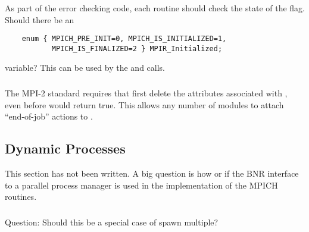 \documentclass{article}
\begin{document}
\subsubsection{}
As part of the error checking code, each routine should check the
state of the  flag.  Should there be an 
\begin{verbatim}
    enum { MPICH_PRE_INIT=0, MPICH_IS_INITIALIZED=1,
           MPICH_IS_FINALIZED=2 } MPIR_Initialized;
\end{verbatim}
variable?  This can be used by the  and
 calls.

\subsubsection{}
The MPI-2 standard requires that  first delete the
attributes associated with , even before
 would return true.  This allows any number of
modules to attach ``end-of-job'' actions to .


\subsection{Dynamic Processes}

This section has not been written.  A big question is how or if the BNR
interface to a parallel process manager is used in the implementation
of the MPICH routines.  

\subsubsection{}
\subsubsection{}
\subsubsection{}
\subsubsection{}
\subsubsection{}
Question:  Should this be a special case of spawn multiple?
\end{document}
